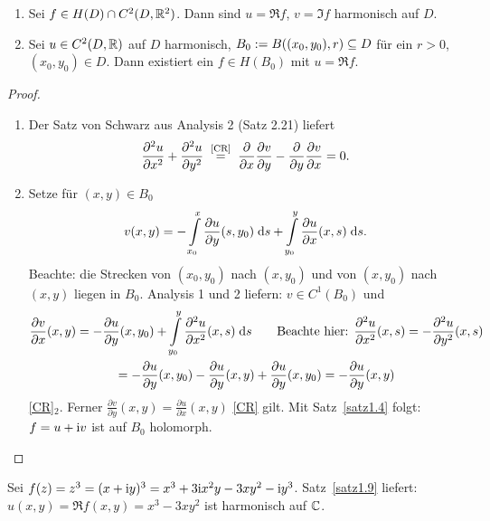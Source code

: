 \documentclass[a4paper,twoside,DIV15,BCOR12mm]{scrbook}
\begin{document}
\begin{satz} \label{satz1.9}
\begin{enumerate}
\item Sei $f\in H(D) \cap C^2(D, \mathbb{R}^2)$. Dann sind $u=\Re f$, $v = \Im f$ harmonisch auf $D$.
\item Sei $u \in C^2(D, \mathbb{R})$ auf $D$ harmonisch, $B_0 := B((x_0,y_0),r) \subseteq D$ für ein $r>0$, $(x_0,y_0)\in D$. Dann existiert ein $f\in H(B_0)$ mit $u = \Re f$.
\end{enumerate}
\end{satz}
\begin{proof}
\begin{enumerate}
\item Der Satz von Schwarz aus Analysis 2 (Satz 2.21) liefert
\[\frac{\partial^2u}{\partial x^2} + \frac{\partial^2u}{\partial y^2} \nach{=}{\eqref{CR}}
\frac{\partial}{\partial x} \frac{\partial v}{\partial y} - \frac{\partial}{\partial y} \frac{\partial v}{\partial x} = 0.\]
\item Setze für $(x, y) \in B_0$
\[v(x, y) = - \int\limits_{x_0}^{x}{\frac{\partial u}{\partial y}(s, y_0)}\;\mathrm{d}s +
\int\limits_{y_0}^{y}{\frac{\partial u}{\partial x}(x, s)}\;\mathrm{d}s.\]
Beachte: die Strecken von $(x_0,y_0)$ nach $(x,y_0)$ und von $(x,y_0)$ nach $(x,y)$ liegen in $B_0$. Analysis 1 und 2 liefern: $v\in C^1(B_0)$ und
\begin{multline*}
\frac{\partial v}{\partial x}(x, y) = - \frac{\partial u}{\partial y}(x, y_0) + \int\limits_{y_0}^{y}{\frac{\partial^2
      u}{\partial x^2}(x, s)}\;\mathrm{d}s \qquad \text{Beachte hier: }\frac{\partial^2
      u}{\partial x^2}(x, s) = - \frac{\partial^2 u}{\partial y^2}(x,s)\\
= - \frac{\partial u}{\partial y}(x, y_0) - \frac{\partial u}{\partial y}(x, y) + \frac{\partial u}{\partial y}(x, y_0)
= - \frac{\partial u}{\partial y}(x, y)
\end{multline*}
\folgt \eqref{CR}$_2$.
Ferner $\frac{\partial v}{\partial y}(x, y) = \frac{\partial u}{\partial x}(x, y)$ \folgt \eqref{CR} gilt. Mit
Satz~\ref{satz1.4} folgt: $f=u+\mathrm{i} v$ ist auf $B_0$ holomorph. \qedhere
\end{enumerate}
\end{proof}

\begin{bsp*}
Sei $f(z) = z^3 = (x+\mathrm{i} y)^3 = x^3 + 3\mathrm{i} x^2 y - 3xy^2 - \mathrm{i} y^3$. Satz~\ref{satz1.9} liefert: $u(x,y) = \Re f(x, y) = x^3 - 3xy^2$ ist harmonisch auf $\mathbb{C}$.
\end{bsp*}
\end{document}
